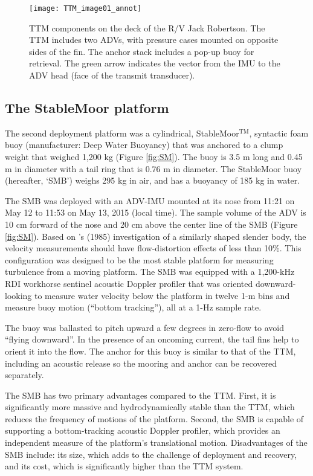 \begin{figure}[t]
  \centering
  \texttt{[image: TTM\_image01\_annot]}
  \caption{TTM components on the deck of the R/V Jack Robertson. The TTM includes two ADVs, with pressure cases mounted on opposite sides of the fin. The anchor stack includes a pop-up buoy for retrieval. The green arrow indicates the vector from the IMU to the ADV head (face of the transmit transducer). }
  \label{fig:ttm:photo}
\end{figure}

\subsection{The StableMoor platform}

The second deployment platform was a cylindrical, StableMoor$^\mathrm{TM}$, syntactic foam buoy (manufacturer: Deep Water Buoyancy) that was anchored to a clump weight that weighed 1,200 kg (Figure \ref{fig:SM}). The buoy is 3.5 m long and 0.45 m in diameter with a tail ring that is 0.76 m in diameter. The StableMoor buoy (hereafter, `SMB') weighs 295 kg in air, and has a buoyancy of 185 kg in water.

The SMB was deployed with an ADV-IMU mounted at its nose from 11:21 on May 12 to 11:53 on May 13, 2015 (local time). The sample volume of the ADV is 10 cm forward of the nose and 20 cm above the center line of the SMB (Figure \ref{fig:SM}). Based on \citeauthor{Wyngaard++1985}'s (1985) investigation of a similarly shaped slender body, the velocity measurements should have flow-distortion effects of less than 10\%. This configuration was designed to be the most stable platform for measuring turbulence from a moving platform. The SMB was equipped with a 1,200-kHz RDI workhorse sentinel acoustic Doppler profiler that was oriented downward-looking to measure water velocity below the platform in twelve 1-m bins and measure buoy motion (``bottom tracking''), all at a 1-Hz sample rate. 

The buoy was ballasted to pitch upward a few degrees in zero-flow to avoid ``flying downward''. In the presence of an oncoming current, the tail fins help to orient it into the flow. The anchor for this buoy is similar to that of the TTM, including an acoustic release so the mooring and anchor can be recovered separately.

The SMB has two primary advantages compared to the TTM. First, it is significantly more massive and hydrodynamically stable than the TTM, which reduces the frequency of motions of the platform. Second, the SMB is capable of supporting a bottom-tracking acoustic Doppler profiler, which provides an independent measure of the platform's translational motion. Disadvantages of the SMB include: its size, which adds to the challenge of deployment and recovery, and its cost, which is significantly higher than the TTM system.

